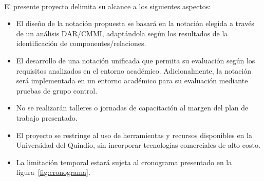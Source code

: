 \label{cap:alcance}
\mbox{}\\
\noindent
El presente proyecto delimita su alcance a los siguientes aspectos:

\begin{itemize}
	\item El diseño de la notación propuesta se basará en la notación elegida a través de un análisis DAR/CMMI, adaptándola según los resultados de la identificación de componentes/relaciones.
	\item El desarrollo de una notación unificada que permita su evaluación según los requisitos analizados en el entorno académico. Adicionalmente, la notación será implementada en un entorno académico para su evaluación mediante pruebas de grupo control.
	\item No se realizarán talleres o jornadas de capacitación al margen del plan de trabajo presentado.
	\item El proyecto se restringe al uso de herramientas y recursos disponibles en la Universidad del Quindío, sin incorporar tecnologías comerciales de alto costo.
	\item La limitación temporal estará sujeta al cronograma presentado en la figura~\ref{fig:cronograma}.
\end{itemize}
